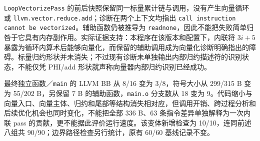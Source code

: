 \texttt{LoopVectorizePass} 的前后快照保留同一标量累计链与调用，没有产生向量循环或 \texttt{llvm.vector.reduce.add}；诊断在两个上下文均指出 \texttt{call instruction cannot be vectorized}。辅助函数仍被推导为 \texttt{readnone}，因此不能把失败简单归咎于它具有内存副作用。实际证据支持：本程序在该版本和配置下，内联将 $3i+5$ 暴露为循环内算术后能够向量化，而保留的辅助调用成为向量化诊断明确指出的障碍。标量归约形状并未消失；不过现有诊断未单独输出内部归约描述符的识别状态，不能仅凭 PHI/add 形状就声称向量器内部归约识别已经成功。

最终独立函数／\texttt{main} 的 LLVM BB 从 8/16 变为 3/8，符号大小从 299/315 B 变为 55/202 B，另保留 7 B 的辅助函数，\texttt{main.o} 分支数从 18 变为 9。代码缩小与向量入口、向量主体、归约和尾部等结构消失相对应，但调用开销、跨过程分析和后续优化机会也同时变化，不能把全部 336 B、63 条指令差异单独解释为一次内联 pass 的贡献，更不能据此评价运行速度。该变体新增检查为 10/10，连同前述八组共 90/90；边界路径检查另行统计，原有 60/60 基线记录不变。

